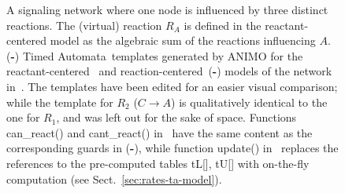 \documentclass{llncs}
\newcommand{\ta}{Timed Automaton}
\newcommand{\tas}{Timed Automata}
\begin{document}
\begin{figure}[thb]
\begin{center}
  \end{center}\vspace{-.5cm}
  \caption{
{\bf\protect{}} A signaling network where one node is influenced by three distinct reactions.
The (virtual) reaction $R_A$ is defined in
the reactant-centered model as the algebraic sum of the reactions influencing $A$.
({\bf\protect{}\--{}\protect{}}) \tas\ templates generated by ANIMO for the reactant-centered~{\bf\protect{}}
 and reaction-centered~({\bf\protect{}\--{}\protect{}}) models of the network in~{\bf\protect{}}.
The templates have been edited for an easier visual comparison; while the template for $R_2$ ($C \rightarrow A$) is qualitatively identical to the one for $R_1$,
and was left out for the sake of space. Functions {\sf can\_react()} and {\sf cant\_react()}
in~{\protect{}} have the same content as the corresponding guards in ({\bf\protect{}\--{}\protect{}}),
while function {\sf update()} in~{\protect{}}
replaces the references to the pre-computed tables {\sf tL[]}, {\sf tU[]} with on-the-fly computation (see Sect.~\ref{sec:rates-ta-model}).
\label{fig:ta-models}}
\end{figure}
\end{document}
